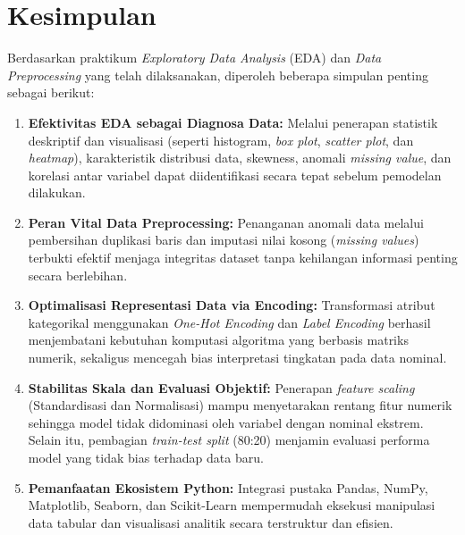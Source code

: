 \chapter{Kesimpulan}
\label{chap:kesimpulan}
Berdasarkan praktikum \textit{Exploratory Data Analysis} (EDA) dan \textit{Data Preprocessing} yang telah dilaksanakan, diperoleh beberapa simpulan penting sebagai berikut:
\begin{enumerate}
    \item \textbf{Efektivitas EDA sebagai Diagnosa Data:} Melalui penerapan statistik deskriptif dan visualisasi (seperti histogram, \textit{box plot}, \textit{scatter plot}, dan \textit{heatmap}), karakteristik distribusi data, skewness, anomali \textit{missing value}, dan korelasi antar variabel dapat diidentifikasi secara tepat sebelum pemodelan dilakukan.
    
    \item \textbf{Peran Vital Data Preprocessing:} Penanganan anomali data melalui pembersihan duplikasi baris dan imputasi nilai kosong (\textit{missing values}) terbukti efektif menjaga integritas dataset tanpa kehilangan informasi penting secara berlebihan.
    
    \item \textbf{Optimalisasi Representasi Data via Encoding:} Transformasi atribut kategorikal menggunakan \textit{One-Hot Encoding} dan \textit{Label Encoding} berhasil menjembatani kebutuhan komputasi algoritma yang berbasis matriks numerik, sekaligus mencegah bias interpretasi tingkatan pada data nominal.
    
    \item \textbf{Stabilitas Skala dan Evaluasi Objektif:} Penerapan \textit{feature scaling} (Standardisasi dan Normalisasi) mampu menyetarakan rentang fitur numerik sehingga model tidak didominasi oleh variabel dengan nominal ekstrem. Selain itu, pembagian \textit{train-test split} (80:20) menjamin evaluasi performa model yang tidak bias terhadap data baru.
    
    \item \textbf{Pemanfaatan Ekosistem Python:} Integrasi pustaka Pandas, NumPy, Matplotlib, Seaborn, dan Scikit-Learn mempermudah eksekusi manipulasi data tabular dan visualisasi analitik secara terstruktur dan efisien.
\end{enumerate}


